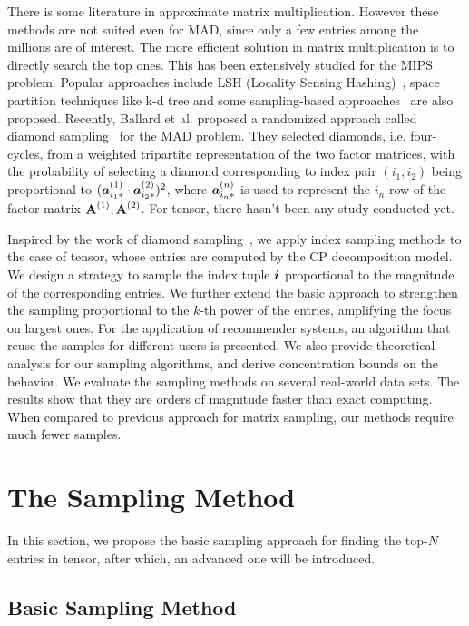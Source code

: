 \documentclass[10pt,journal,compsoc]{IEEEtran}
\newcommand{\V}[1]{{\boldsymbol{{\MakeLowercase{#1}}}}}
\newcommand{\RowVecA}[1]{\V{a}^{(#1)}_{i_#1*}}
\newcommand{\M}[1]{{\textbf{{\MakeUppercase{#1}}}}}
\newcommand{\FacMat}[2]{\M{#1}^{(#2)}}
\begin{document}
There is some literature in approximate matrix multiplication.
However these methods are not suited even for MAD, since only a few entries among the millions are of interest. The more efficient solution in  matrix multiplication is to directly search the top ones. This has been extensively studied for the MIPS problem. Popular approaches include LSH (Locality Sensing Hashing)~\cite{Andoni08,ALSH14}, space partition techniques like k-d tree and some sampling-based approaches~\cite{Drineas2006,John15} are also proposed. Recently, Ballard et al. proposed a randomized approach called diamond sampling~\cite{BaPiKoSe15} for the MAD problem. They selected diamonds, i.e. four-cycles, from a weighted tripartite representation of the two factor matrices, with the probability of selecting a diamond corresponding to index pair $(i_1,i_2)$ being proportional to $(\RowVecA{1}\cdot\RowVecA{2})^2$, where $\RowVecA{n}$ is used to represent the $i_n$ row of the factor matrix $\FacMat{A}{1},\FacMat{A}{2}$. For tensor, there hasn't been any study conducted yet.

Inspired by the work of diamond sampling~\cite{BaPiKoSe15}, we apply index sampling methods to the case of tensor, whose entries are computed by the CP decomposition model. We design a strategy to sample the index tuple $\V{i}$ proportional to the magnitude of the corresponding entries. We further extend the basic approach to strengthen the sampling proportional to the $k$-th power of the entries, amplifying the focus on largest ones. For the application of recommender systems, an algorithm that reuse the samples for different users is presented. We also provide theoretical analysis for our sampling algorithms, and derive concentration bounds on the behavior. We evaluate the sampling methods on several real-world data sets. The results show that they are orders of magnitude faster than exact computing. When compared to previous approach for matrix sampling, our methods require much fewer samples. 

\section{The Sampling Method}
In this section, we propose the basic sampling approach for finding the top-$N$ entries in tensor, after which, an advanced one will be introduced.


\subsection{Basic Sampling Method}
\end{document}
